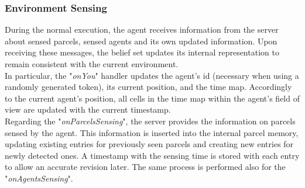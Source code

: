         \subsubsection{Environment Sensing}
            During the normal execution, the agent receives information from the server about sensed parcels, sensed agents and its own updated information. Upon receiving these messages, the belief set updates its internal representation to remain consistent with the current environment.
            \medskip\\
            In particular, the "\textit{onYou}" handler updates the agent's id (necessary when using a randomly generated token), its current position, and the time map. Accordingly to the current agent's position, all cells in the time map within the agent's field of view are updated with the current timestamp.
            \medskip\\
            Regarding the "\textit{onParcelsSensing}", the server provides the information on parcels sensed by the agent. This information is inserted into the internal parcel memory, updating existing entries for previously seen parcels and creating new entries for newly detected ones. A timestamp with the sensing time is stored with each entry to allow an accurate revision later. The same process is performed also for the "\textit{onAgentsSensing}".

